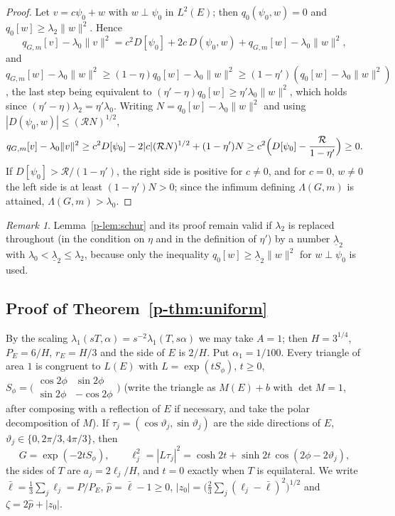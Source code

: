 \documentclass[11pt]{article}
\theoremstyle{remark}
\newtheorem{remark}[theorem]{Remark}
\begin{document}
\begin{proof}
Let $v=c\psi_0+w$ with $w\perp\psi_0$ in $L^2(E)$; then $q_0(\psi_0,w)=0$ and
$q_0[w]\ge\lambda_2\|w\|^2$. Hence
\[
  q_{G,m}[v]-\lambda_0\|v\|^2=c^2D[\psi_0]+2c\,D(\psi_0,w)+q_{G,m}[w]-\lambda_0\|w\|^2 ,
\]
and $q_{G,m}[w]-\lambda_0\|w\|^2\ge(1-\eta)q_0[w]-\lambda_0\|w\|^2\ge
(1-\eta')(q_0[w]-\lambda_0\|w\|^2)$, the last step being equivalent to
$(\eta'-\eta)q_0[w]\ge\eta'\lambda_0\|w\|^2$, which holds since
$(\eta'-\eta)\lambda_2=\eta'\lambda_0$. Writing $N=q_0[w]-\lambda_0\|w\|^2$ and using
$|D(\psi_0,w)|\le(\mathcal RN)^{1/2}$,
\[
  q_{G,m}[v]-\lambda_0\|v\|^2\ge c^2D[\psi_0]-2|c|(\mathcal RN)^{1/2}+(1-\eta')N\ge
  c^2\Bigl(D[\psi_0]-\frac{\mathcal R}{1-\eta'}\Bigr)\ge0 .
\]
If $D[\psi_0]>\mathcal R/(1-\eta')$, the right side is positive for $c\ne0$, and for $c=0$,
$w\ne0$ the left side is at least $(1-\eta')N>0$; since the infimum defining $\Lambda(G,m)$ is
attained, $\Lambda(G,m)>\lambda_0$.
\end{proof}
\begin{remark}\label{p-rem:lam2}
Lemma~\ref{p-lem:schur} and its proof remain valid if $\lambda_2$ is replaced throughout (in the
condition on $\eta$ and in the definition of $\eta'$) by a number $\underline\lambda_2$ with
$\lambda_0<\underline\lambda_2\le\lambda_2$, because only the inequality
$q_0[w]\ge\underline\lambda_2\|w\|^2$ for $w\perp\psi_0$ is used.
\end{remark}

\subsection*{Proof of Theorem~\ref{p-thm:uniform}}
By the scaling $\lambda_1(sT,\alpha)=s^{-2}\lambda_1(T,s\alpha)$ we may take $A=1$; then
$H=3^{1/4}$, $P_E=6/H$, $r_E=H/3$ and the side of $E$ is $2/H$. Put $\alpha_1=1/100$. Every
triangle of area $1$ is congruent to $L(E)$ with $L=\exp(tS_\phi)$, $t\ge0$,
$S_\phi=\bigl(\begin{smallmatrix}\cos2\phi&\sin2\phi\\ \sin2\phi&-\cos2\phi\end{smallmatrix}\bigr)$
(write the triangle as $M(E)+b$ with $\det M=1$, after composing with a reflection of $E$ if
necessary, and take the polar decomposition of $M$). If $\tau_j=(\cos\vartheta_j,\sin\vartheta_j)$
are the side directions of $E$, $\vartheta_j\in\{0,2\pi/3,4\pi/3\}$, then
\begin{equation}\label{p-eq:ell}
  G=\exp(-2tS_\phi),\qquad \ell_j^2=|L\tau_j|^2=\cosh2t+\sinh2t\,\cos(2\phi-2\vartheta_j),
\end{equation}
the sides of $T$ are $a_j=2\ell_j/H$, and $t=0$ exactly when $T$ is equilateral. We write
$\bar\ell=\frac13\sum_j\ell_j=P/P_E$, $\hat p=\bar\ell-1\ge0$,
$|z_0|=\bigl(\tfrac23\sum_j(\ell_j-\bar\ell)^2\bigr)^{1/2}$ and $\zeta=2\hat p+|z_0|$.
\end{document}
